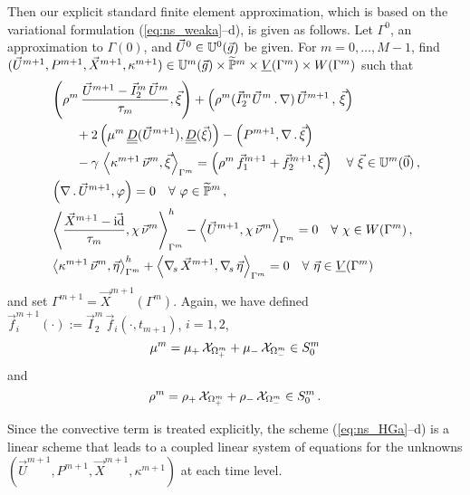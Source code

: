Then our explicit standard finite element approximation, which is based on the
variational formulation (\ref{eq:ns_weaka}--d), is given as follows. Let
$\Gamma^0$, an approximation to $\Gamma(0)$, and $\vec U^0\in \uspacedisc{g}{0}$
be given. For $m=0,\ldots, M-1$, find $(\vec U^{m+1},P^{m+1}, \vec X^{m+1},
\kappa^{m+1}) \in \uspacedisc{g}{m}\times \pnormspace^m \times \Vh \times \Wh$
such that
\begin{subequations}
\begin{align}
& \left( \rho^m\,\frac{\vec U^{m+1} - \vec I^m_2\,\vec U^m}{\tau_m}, \vec
\xi \right) + \left(\rho^m(\vec I^m_2\vec U^m\,.\,\nabla)\,\vec U^{m+1}\,,
\,\vec \xi \right)\nonumber \\
& \qquad + 2\left(\mu^m\,\mat D(\vec U^{m+1}), \mat D(\vec \xi) \right)
- \left(P^{m+1}, \nabla\,.\,\vec \xi\right) \nonumber \\
& \qquad - \gamma\,\left\langle \kappa^{m+1}\,\vec\nu^m ,
\vec\xi\right\rangle_{\Gamma^m}
= \left(\rho^m\,\vec f_1^{m+1}+\vec f_2^{m+1}, \vec \xi\right)
\quad \forall\ \vec\xi \in \uspacedisc{0}{m}\,, \label{eq:ns_HGa} \\
& \left(\nabla\,.\,\vec U^{m+1}, \varphi\right)  = 0
\quad \forall\ \varphi \in \pnormspace^m\,,\label{eq:ns_HGb} \\
&  \left\langle \frac{\vec X^{m+1} - \vec\id}{\tau_m} ,\chi\,\vec\nu^m
\right\rangle_{\Gamma^m}^h - \left\langle \vec U^{m+1}, \chi\,\vec\nu^m
\right\rangle_{\Gamma^m}  = 0 \quad \forall\ \chi \in \Wh\,, \label{eq:ns_HGc}\\
& \left\langle \kappa^{m+1}\,\vec\nu^m, \vec\eta \right\rangle_{\Gamma^m}^h
+ \left\langle \nabs\,\vec X^{m+1}, \nabs\,\vec \eta \right\rangle_{\Gamma^m} =
0 \quad \forall\ \vec\eta \in \Vh \label{eq:ns_HGd}
\end{align}
\end{subequations}
and set $\Gamma^{m+1} = \vec X^{m+1}(\Gamma^m)$. Again, we have defined
$\vec f_i^{m+1}(\cdot) := \vec I^m_2\,\vec f_i(\cdot,t_{m+1})$, $i=1,2$,
\begin{equation}
\mu^m = \mu_+\,\charfcn{\Omega^m_+} + \mu_-\,\charfcn{\Omega^m_-}\in S^m_0
\end{equation}
and
\begin{equation}
\rho^m = \rho_+\,\charfcn{\Omega^m_+} + \rho_-\,\charfcn{\Omega^m_-}\in S^m_0\,.
\end{equation}

Since the convective term is treated explicitly, the scheme
(\ref{eq:ns_HGa}--d) is a linear scheme that leads to a coupled linear system of
equations for the unknowns $(\vec U^{m+1}, P^{m+1}, \vec X^{m+1}, \kappa^{m+1})$
at each time level.

